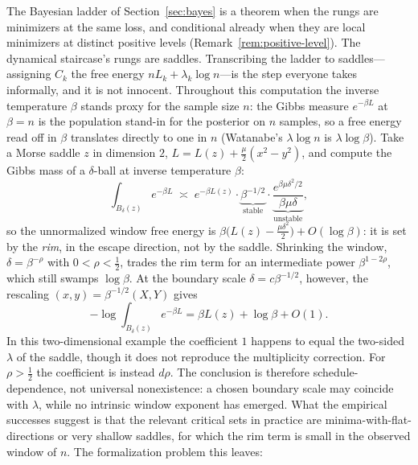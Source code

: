 \documentclass[11pt]{amsart}
\theoremstyle{plain}
\theoremstyle{definition}
\begin{document}
The Bayesian ladder of Section~\ref{sec:bayes} is a theorem when the rungs are minimizers at the same loss, and conditional already when they are local minimizers at distinct positive levels (Remark~\ref{rem:positive-level}). The dynamical staircase's rungs are saddles. Transcribing the ladder to saddles---assigning $C_k$ the free energy $n L_k + \lambda_k \log n$---is the step everyone takes informally, and it is not innocent. Throughout this computation the inverse temperature $\beta$ stands proxy for the sample size $n$: the Gibbs measure $e^{-\beta L}$ at $\beta = n$ is the population stand-in for the posterior on $n$ samples, so a free energy read off in $\beta$ translates directly to one in $n$ (Watanabe's $\lambda \log n$ is $\lambda \log \beta$). Take a Morse saddle $z$ in dimension $2$, $L = L(z) + \tfrac{\mu}{2}(x^2 - y^2)$, and compute the Gibbs mass of a $\delta$-ball at inverse temperature $\beta$:
\[
   \int_{B_\delta(z)} e^{-\beta L} \;\asymp\; e^{-\beta L(z)} \cdot \underbrace{\beta^{-1/2}}_{\text{stable}} \cdot \underbrace{\frac{e^{\beta \mu \delta^2 / 2}}{\beta \mu \delta}}_{\text{unstable}} ,
\]
so the unnormalized window free energy is $\beta \bigl( L(z) - \tfrac{\mu \delta^2}{2} \bigr) + O(\log \beta)$: it is set by the \emph{rim}, in the escape direction, not by the saddle. Shrinking the window, $\delta = \beta^{-\rho}$ with $0 < \rho < \tfrac12$, trades the rim term for an intermediate power $\beta^{1 - 2\rho}$, which still swamps $\log \beta$. At the boundary scale $\delta=c\beta^{-1/2}$, however, the rescaling $(x,y)=\beta^{-1/2}(X,Y)$ gives
\[
   -\log\int_{B_\delta(z)}e^{-\beta L}
   =\beta L(z)+\log\beta+O(1).
\]
In this two-dimensional example the coefficient $1$ happens to equal the two-sided $\lambda$ of the saddle, though it does not reproduce the multiplicity correction. For $\rho>\tfrac12$ the coefficient is instead $d\rho$. The conclusion is therefore schedule-dependence, not universal nonexistence: a chosen boundary scale may coincide with $\lambda$, while no intrinsic window exponent has emerged. What the empirical successes \cite{chen2023, hoogland2024} suggest is that the relevant critical sets in practice are minima-with-flat-directions or very shallow saddles, for which the rim term is small in the observed window of $n$. The formalization problem this leaves:
\end{document}
